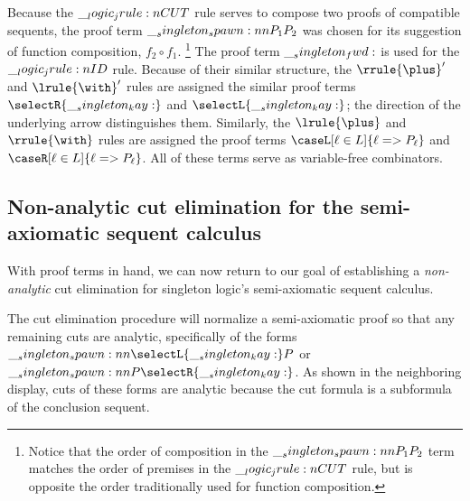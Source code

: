 Because the $\__logic_jrule:n {CUT}$ rule serves to compose two proofs of compatible sequents, the proof term $\__singleton_spawn:nn {P_1} {P_2}$ was chosen for its suggestion of function composition, $f_2 \circ f_1$.%
\footnote{Notice that the order of composition in the $\__singleton_spawn:nn {P_1} {P_2}$ term matches the order of premises in the $\__logic_jrule:n {CUT}$ rule, but is opposite the order traditionally used for function composition.}
The proof term $\__singleton_fwd:$ is used for the $\__logic_jrule:n {ID}$ rule.
%
Because of their similar structure, the $\rrule{\plus}'$ and $\lrule{\with}'$ rules are assigned the similar proof terms $\selectR{\kay}$ and $\selectL{\kay}$; the direction of the underlying arrow distinguishes them.
Similarly, the $\lrule{\plus}$ and $\rrule{\with}$ rules are assigned the proof terms $\caseL[\ell \in L]{\ell => P_{\ell}}$ and $\caseR[\ell \in L]{\ell => P_{\ell}}$.
%
All of these terms serve as variable-free combinators.%
%
\subsection{Non-analytic cut elimination for the semi-axiomatic sequent calculus}\label{sec:singleton-logic:sax:cutelim}

With proof terms in hand, we can now return to our goal of establishing a \emph{non-analytic} cut elimination  for singleton logic's semi-axiomatic sequent calculus.

The cut elimination procedure will normalize a semi-axiomatic proof so that any remaining cuts are analytic, specifically of the forms $\spawn{\selectL{\kay}}{P}$ or $\spawn{P}{\selectR{\kay}}$.
As shown in the neighboring display,%
%
%
cuts of these forms are analytic because the cut formula is a subformula of the conclusion sequent.

